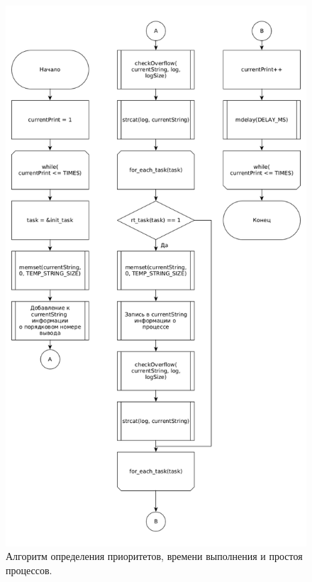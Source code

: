 \begin{figure}[H]
	\centering
	\includegraphics[scale=0.5]{img/printTasks.png}
	\caption{Алгоритм определения приоритетов, времени выполнения и простоя процессов. }
	\label{fig:printTasks}
\end{figure}

